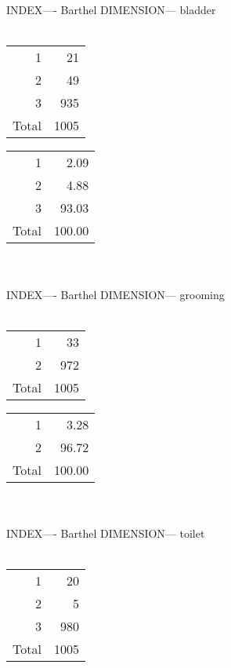 \documentclass[11pt]{article}
\begin{document}
\\\\ 
INDEX---- Barthel DIMENSION--- bladder 
 \\\\ 
% 
\begin{tabular}{rr}
   \hline
1 &  21 \\ 
  2 &  49 \\ 
  3 & 935 \\ 
  Total & 1005 \\ 
   \hline
\end{tabular}
% 
\begin{tabular}{rr}
   \hline
1 & 2.09 \\ 
  2 & 4.88 \\ 
  3 & 93.03 \\ 
  Total & 100.00 \\ 
   \hline
\end{tabular}
\\\\ 
INDEX---- Barthel DIMENSION--- grooming 
 \\\\ 
% 
\begin{tabular}{rr}
   \hline
1 &  33 \\ 
  2 & 972 \\ 
  Total & 1005 \\ 
   \hline
\end{tabular}
% 
\begin{tabular}{rr}
   \hline
1 & 3.28 \\ 
  2 & 96.72 \\ 
  Total & 100.00 \\ 
   \hline
\end{tabular}
\\\\ 
INDEX---- Barthel DIMENSION--- toilet 
 \\\\ 
% 
\begin{tabular}{rr}
   \hline
1 &  20 \\ 
  2 &   5 \\ 
  3 & 980 \\ 
  Total & 1005 \\ 
   \hline
\end{tabular}
\end{document}
